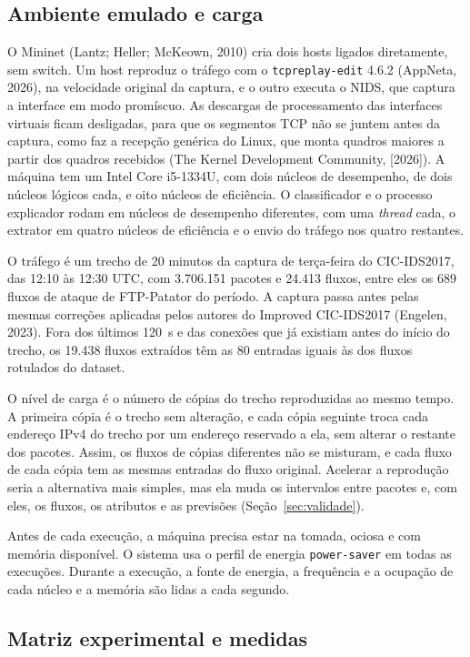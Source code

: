 \documentclass[
  article,
  12pt,
  oneside,
  a4paper,
  english,
  brazil
]{abntex2}
\begin{document}
\subsection{Ambiente emulado e carga}

O Mininet (Lantz; Heller; McKeown, 2010) cria dois hosts ligados diretamente, sem switch. Um host reproduz o tráfego com o
\texttt{tcpreplay-edit} 4.6.2 (AppNeta, 2026), na velocidade original da captura, e o outro executa o NIDS, que
captura a interface em modo promíscuo. As descargas de processamento das interfaces virtuais ficam
desligadas, para que os segmentos TCP não se juntem antes da captura, como faz a recepção genérica
do Linux, que monta quadros maiores a partir dos quadros recebidos (The Kernel Development
Community, [2026]). A máquina tem um Intel Core
i5-1334U, com dois núcleos de desempenho, de dois núcleos lógicos cada, e oito núcleos de
eficiência. O classificador e o processo
explicador rodam em núcleos de desempenho diferentes, com uma \emph{thread} cada, o extrator em
quatro núcleos de eficiência e o envio do tráfego nos quatro restantes.

O tráfego é um trecho de 20 minutos da captura de terça-feira do CIC-IDS2017, das 12:10 às 12:30
UTC, com 3.706.151 pacotes e 24.413 fluxos, entre eles os 689 fluxos de ataque de FTP-Patator do
período. A captura passa antes pelas mesmas correções aplicadas pelos autores do Improved
CIC-IDS2017 (Engelen, 2023). Fora dos últimos 120~s e das conexões que já existiam antes do início do trecho, os
19.438 fluxos extraídos têm as 80 entradas iguais às dos fluxos rotulados do dataset.

O nível de carga é o número de cópias do trecho reproduzidas ao mesmo tempo. A primeira cópia é o
trecho sem alteração, e cada cópia seguinte troca cada endereço IPv4 do trecho por um endereço
reservado a ela, sem alterar o restante dos pacotes. Assim, os fluxos de cópias diferentes não se
misturam, e cada fluxo de cada cópia tem as mesmas entradas do fluxo original. Acelerar a
reprodução seria a alternativa mais simples, mas ela muda os intervalos entre pacotes e, com eles,
os fluxos, os atributos e as previsões (Seção~\ref{sec:validade}).

Antes de cada execução, a máquina precisa estar na tomada, ociosa e com memória disponível. O sistema
usa o perfil de energia \texttt{power-saver} em todas as execuções. Durante a execução, a fonte de
energia, a frequência e a ocupação de cada núcleo e a memória são lidas a cada segundo.

\subsection{Matriz experimental e medidas}
\end{document}
